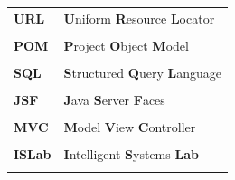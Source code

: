 \documentclass[a4paper, 12pt, oneside]{Thesis}  %
\begin{document}
\begin{table}[!h]
\begin{tabular}{ll}
	\textbf{URL}	& \textbf{U}niform \textbf{R}esource  \textbf{L}ocator  \\ \\
	\textbf{POM}	& \textbf{P}roject \textbf{O}bject  \textbf{M}odel  \\ \\
	\textbf{SQL}	& \textbf{S}tructured \textbf{Q}uery  \textbf{L}anguage  \\ \\
	\textbf{JSF}	& \textbf{J}ava \textbf{S}erver  \textbf{F}aces  \\ \\
	\textbf{MVC}	& \textbf{M}odel \textbf{V}iew  \textbf{C}ontroller  \\ \\			      	\textbf{ISLab}	& \textbf{I}ntelligent \textbf{S}ystems  \textbf{Lab}  \\ \\
\end{tabular}
\end{table}
\newpage
\thispagestyle{empty}
\mbox{}





\pagestyle{empty}  %




\mainmatter	  %
\lhead[\rm\thepage]{\fancyplain{}{\sl{\rightmark}}}
\pagestyle{fancy}  %



 

\newpage
\thispagestyle{empty}
\mbox{}

 



 
\end{document}
